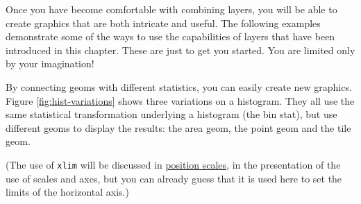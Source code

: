 
Once you have become comfortable with combining layers, you will be able
to create graphics that are both intricate and useful. The following
examples demonstrate some of the ways to use the capabilities of layers
that have been introduced in this chapter. These are just to get you
started. You are limited only by your imagination!


By connecting geoms with different statistics, you can easily create new
graphics. Figure \ref{fig:hist-variations} shows three variations on a
histogram. They all use the same statistical transformation underlying a
histogram (the bin stat), but use different geoms to display the
results: the area geom, the point geom and the tile geom.
 

(The use of \texttt{xlim} will be discussed in
\hyperref[sub:scale-position]{position scales}, in the presentation of
the use of scales and axes, but you can already guess that it is used
here to set the limits of the horizontal axis.)

\begin{Shaded}
\begin{Highlighting}[]
\StringTok{ }\StringTok{ }\NormalTok{(}\NormalTok{, }\NormalTok{)}
\StringTok{ }\NormalTok{(}\NormalTok{(}  \NormalTok{, } \NormalTok{)}
\StringTok{ }\NormalTok{(}\NormalTok{(}  \NormalTok{, }
   \NormalTok{, }\NormalTok{)}
\StringTok{ }\NormalTok{(}\NormalTok{(} \NormalTok{(}\NormalTok{), } 
   \NormalTok{, }\NormalTok{)}
\end{Highlighting}
\end{Shaded}

